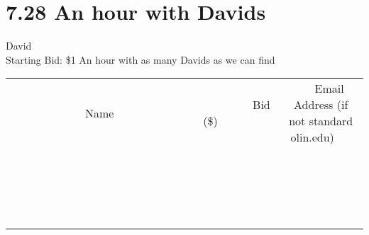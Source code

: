 \documentclass[11pt]{article}
\begin{document}
\section*{7.28 An hour with Davids}
David
\\
Starting Bid: \$1
\newline
An hour with as many Davids as we can find
\\[3ex]
\begin{tabular}{c c c}
~~~~~~~~~~~~~Name~~~~~~~~~~~~~ & ~~~~~~~~~Bid (\$)~~~~~~~~~  & ~~~Email Address (if not standard olin.edu)~~~\\
 & & \\
\hline
 & & \\
\hline
 & & \\
\hline
 & & \\
\hline
 & & \\
\hline
 & & \\
\hline
 & & \\
\hline
 & & \\
\hline
 & & \\
\hline
 & & \\
\hline
 & & \\
\hline
 & & \\
\hline
 & & \\
\hline
 & & \\
\hline
 & & \\
\hline
 & & \\
\hline
 & & \\
\hline
 & & \\
\hline
 & & \\
\hline
\end{tabular}
\newpage
\end{document}
